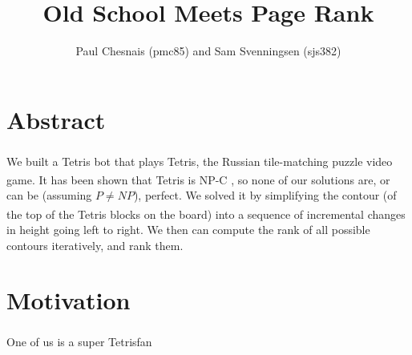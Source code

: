 \documentclass[ fontsize=11pt]{article}
\title{Old School \tetris{} Meets Page Rank}
\author{Paul Chesnais (pmc85) and Sam Svenningsen (sjs382)}
\date{}
\def\tetris{Tetris\textsuperscript{\textregistered}}
\begin{document}
\maketitle
\thispagestyle{empty}
\newpage
\section{Abstract}
\label{sec:abstract}

\par We built a \tetris{} bot that plays \tetris{}, the Russian tile-matching puzzle video game. It has been shown that \tetris{} is NP-C \cite{tetrishard}, so none of our solutions are, or can be (assuming $P \neq NP$), perfect.  We solved it by simplifying the contour (of the top of the \tetris{} blocks on the board) into a sequence of incremental changes in height going left to right. We then can compute the rank of all possible contours iteratively, and rank them.




\section{Motivation}
\label{sec:motivation}
One of us is a super \tetris{}fan
\end{document}
